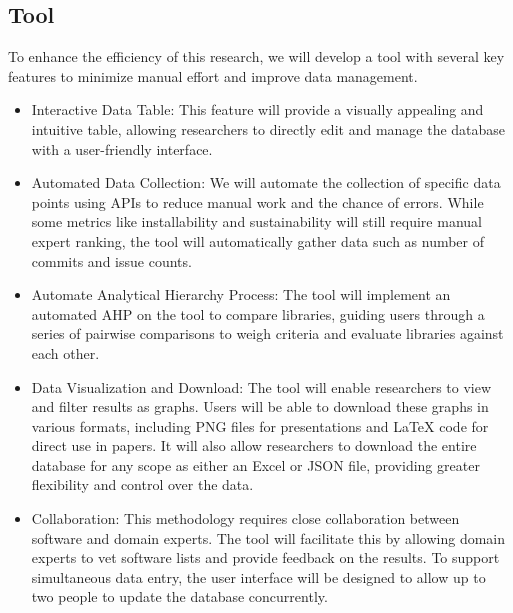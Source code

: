\documentclass{article}
\begin{document}
\subsection{Tool}
To enhance the efficiency of this research, we will develop a tool with several key features to minimize manual effort and improve data management.
\begin{itemize}
    \item Interactive Data Table: This feature will provide a visually appealing and intuitive table, allowing researchers to directly edit and manage the database with a user-friendly interface.
    \item Automated Data Collection: We will automate the collection of specific data points using APIs to reduce manual work and the chance of errors. While some metrics like installability and sustainability will still require manual expert ranking, the tool will automatically gather data such as number of commits and issue counts.
    \item Automate Analytical Hierarchy Process: The tool will implement an automated AHP on the tool to compare libraries, guiding users through a series of pairwise comparisons to weigh criteria and evaluate libraries against each other.
    \item Data Visualization and Download: The tool will enable researchers to view and filter results as graphs. Users will be able to download these graphs in various formats, including PNG files for presentations and LaTeX code for direct use in papers. It will also allow researchers to download the entire database for any scope as either an Excel or JSON file, providing greater flexibility and control over the data.
    \item Collaboration: This methodology requires close collaboration between software and domain experts. The tool will facilitate this by allowing domain experts to vet software lists and provide feedback on the results. To support simultaneous data entry, the user interface will be designed to allow up to two people to update the database concurrently.
\end{itemize}
\end{document}
